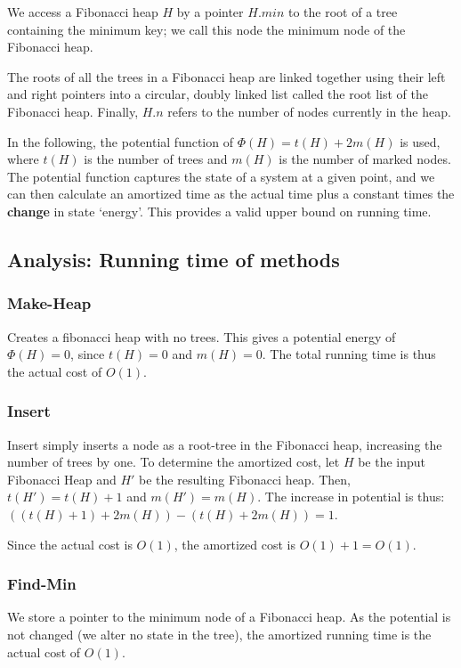We access a Fibonacci heap $H$ by a pointer $H.min$ to the
root of a tree containing the minimum key; we call this node the
minimum node of the Fibonacci heap.

The roots of all the trees in a Fibonacci heap are linked
together using their left and right pointers into a circular,
doubly linked list called the root list of the Fibonacci heap.
Finally, $H.n$ refers to the number of nodes currently in the heap.

In the following, the potential function of $\Phi(H) = t(H) + 2m(H)$ is used,
where $t(H)$ is the number of trees and $m(H)$ is the number of marked nodes.
The potential function captures the state of a system at a given point, and
we can then calculate an amortized time as the actual time plus a constant times
the \textbf{change} in state `energy'. This provides a valid upper bound on running
time.

\subsection{Analysis: Running time of methods}
\subsubsection{Make-Heap}
Creates a fibonacci heap with no trees. This gives a potential energy of
$\Phi(H) = 0$, since $t(H)=0$ and $m(H)=0$. The total running time is thus the
actual cost of $O(1)$.

\subsubsection{Insert}
Insert simply inserts a node as a root-tree in the Fibonacci heap, increasing
the number of trees by one. To determine the amortized cost, let $H$ be the
input Fibonacci Heap and $H'$ be the resulting Fibonacci heap. Then,
$t(H')=t(H)+1$ and $m(H')=m(H)$. The increase in potential is thus: $((t(H)+1)
+ 2m(H)) - (t(H) + 2m(H)) = 1$.

Since the actual cost is $O(1)$, the amortized cost is $O(1) + 1 = O(1)$.

\subsubsection{Find-Min}
We store a pointer to the minimum node of a Fibonacci heap. As the potential
is not changed (we alter no state in the tree), the amortized running time is
the actual cost of $O(1)$.

